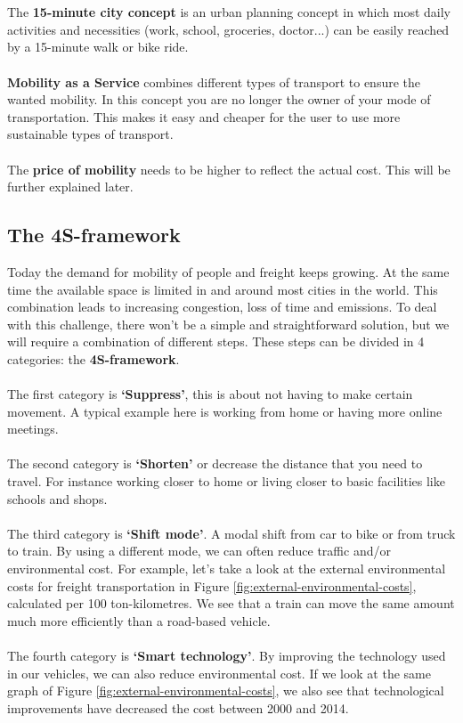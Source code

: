 \documentclass[../summary.tex]{subfiles}
\begin{document}
\\\\
The \textbf{15-minute city concept} is an urban planning concept in which most daily activities and necessities (work, school, groceries, doctor...) can be easily reached by a 15-minute walk or bike ride.
\\\\
\textbf{Mobility as a Service} combines different types of transport to ensure the wanted mobility. In this concept you are no longer the owner of your mode of transportation. This makes it easy and cheaper for the user to use more sustainable types of transport.
\\\\
The \textbf{price of mobility} needs to be higher to reflect the actual cost. This will be further explained later.

\newpage
\subsection{The 4S-framework}

Today the demand for mobility of people and freight keeps growing. At the same time the available space is limited in and around most cities in the world. This combination leads to increasing congestion, loss of time and emissions. To deal with this challenge, there won't be a simple and straightforward solution, but we will require a combination of different steps. These steps can be divided in 4 categories: the \textbf{4S-framework}.
\\\\
The first category is \textbf{`Suppress'}, this is about not having to make certain movement. A typical example here is working from home or having more online meetings.
\\\\
The second category is \textbf{`Shorten'} or decrease the distance that you need to travel. For instance working closer to home or living closer to basic facilities like schools and shops.
\\\\
The third category is \textbf{`Shift mode'}. A modal shift from car to bike or from truck to train. By using a different mode, we can often reduce traffic and/or environmental cost. For example, let's take a look at the external environmental costs for freight transportation in Figure \ref{fig:external-environmental-costs}, calculated per 100 ton-kilometres. We see that a train can move the same amount much more efficiently than a road-based vehicle.
\\\\
The fourth category is \textbf{`Smart technology'}. By improving the technology used in our vehicles, we can also reduce environmental cost. If we look at the same graph of Figure \ref{fig:external-environmental-costs}, we also see that technological improvements have decreased the cost between 2000 and 2014.
\end{document}
